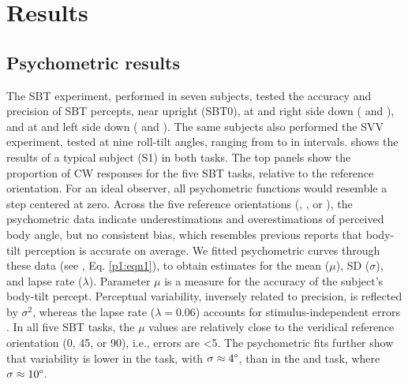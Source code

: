 \section{Results}

\subsection{Psychometric results}
 
The SBT experiment, performed in seven subjects, tested the accuracy and precision of SBT percepts, near upright (SBT0), at  and  right side down ( and ), and at  and  left side down ( and ). The same subjects also performed the SVV experiment, tested at nine roll-tilt angles, ranging from  to  in  intervals.  shows the results of a typical subject (S1) in both tasks. The top panels show the proportion of CW responses for the five SBT tasks, relative to the reference orientation. For an ideal observer, all psychometric functions would resemble a step centered at zero. Across the five reference orientations (, , or ), the psychometric data indicate underestimations and overestimations of perceived body angle, but no consistent bias, which resembles previous reports \cite{mittelstaedt1983, mast1996, jarchow1999, vanbeuzekom2001} that body-tilt perception is accurate on average. We fitted psychometric curves through these data (see , Eq. \ref{p1:eqn1}), to obtain estimates for the mean ($\mu$), SD ($\sigma$), and lapse rate ($\lambda$). Parameter $\mu$ is a measure for the accuracy of the subject's body-tilt percept. Perceptual variability, inversely related to precision, is reflected by $\sigma^2$, whereas the lapse rate ($\lambda = 0.06$) accounts for stimulus-independent errors \cite{wichmann2001}. In all five SBT tasks, the $\mu$ values are relatively close to the veridical reference orientation (0\textdegree, 45\textdegree, or 90\textdegree), i.e., errors are \textless5\textdegree. The psychometric fits further show that variability is lower in the  task, with $\sigma \approx 4\degree$, than in the  and  task, where $\sigma \approx 10\degree$. 

